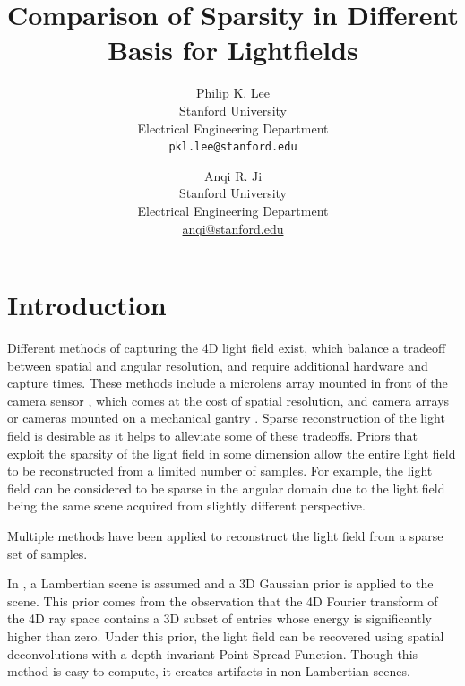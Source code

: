 \documentclass[10pt,twocolumn,letterpaper]{article}
\begin{document}
\title{Comparison of Sparsity in Different Basis for Lightfields}

\author{Philip K. Lee\\
Stanford University\\
Electrical Engineering Department\\
{\tt\small pkl.lee@stanford.edu}
\and
Anqi R. Ji\\
Stanford University\\
Electrical Engineering Department\\
{\small\url{anqi@stanford.edu}}
}

\maketitle
\thispagestyle{empty}

\begin{abstract}

\end{abstract}

\section{Introduction}

Different methods of capturing the 4D light field exist, which balance a tradeoff between spatial and angular resolution, and require additional hardware and capture times. These methods include a microlens array mounted in front of the camera sensor \cite{NgLF}, which comes at the cost of spatial resolution, and camera arrays \cite{LFArray} or cameras mounted on a mechanical gantry \cite{LFRendering}. Sparse reconstruction of the light field is desirable as it helps to alleviate some of these tradeoffs. Priors that exploit the sparsity of the light field in some dimension allow the entire light field to be reconstructed from a limited number of samples. For example, the light field can be considered to be sparse in the angular domain due to the light field being the same scene acquired from slightly different perspective. 

Multiple methods have been applied to reconstruct the light field from a sparse set of samples. 

In \cite{DimGapLFPrior}, a Lambertian scene is assumed and a 3D Gaussian prior is applied to the scene. This prior comes from the observation that the 4D Fourier transform of the 4D ray space contains a 3D subset of entries whose energy is significantly higher than zero. Under this prior, the light field can be recovered using spatial deconvolutions with a depth invariant Point Spread Function. Though this method is easy to compute, it creates artifacts in non-Lambertian scenes.
\end{document}
